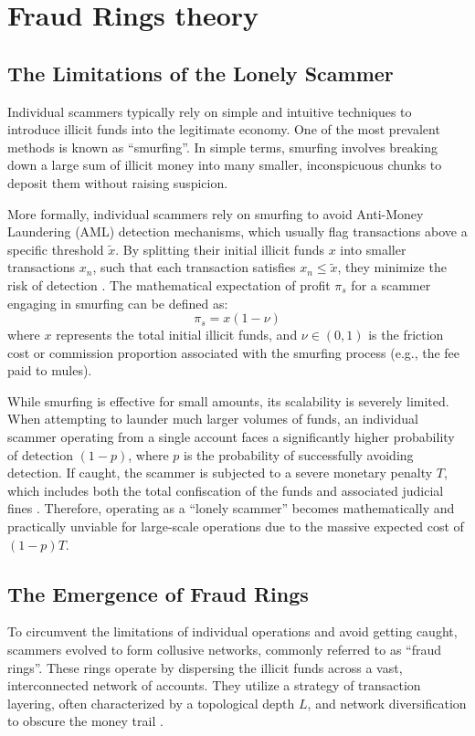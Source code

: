 \chapter{Fraud Rings theory}
\label{ch:fraud_ring_theory}

\section{The Limitations of the Lonely Scammer}
Individual scammers typically rely on simple and intuitive techniques to introduce illicit funds into the legitimate economy. One of the most prevalent methods is known as ``smurfing''. In simple terms, smurfing involves breaking down a large sum of illicit money into many smaller, inconspicuous chunks to deposit them without raising suspicion. 

More formally, individual scammers rely on smurfing to avoid Anti-Money Laundering (AML) detection mechanisms, which usually flag transactions above a specific threshold $\tilde{x}$. By splitting their initial illicit funds $x$ into smaller transactions $x_n$, such that each transaction satisfies $x_n \leq \tilde{x}$, they minimize the risk of detection \cite{contreras2026strategic}. The mathematical expectation of profit $\pi_s$ for a scammer engaging in smurfing can be defined as:
\begin{equation}
    \pi_s = x(1-\nu)
\end{equation}
where $x$ represents the total initial illicit funds, and $\nu \in (0,1)$ is the friction cost or commission proportion associated with the smurfing process (e.g., the fee paid to mules). 

While smurfing is effective for small amounts, its scalability is severely limited. When attempting to launder much larger volumes of funds, an individual scammer operating from a single account faces a significantly higher probability of detection $(1-p)$, where $p$ is the probability of successfully avoiding detection. If caught, the scammer is subjected to a severe monetary penalty $T$, which includes both the total confiscation of the funds and associated judicial fines \cite{contreras2026strategic}. Therefore, operating as a ``lonely scammer'' becomes mathematically and practically unviable for large-scale operations due to the massive expected cost of $(1-p)T$.

\section{The Emergence of Fraud Rings}
To circumvent the limitations of individual operations and avoid getting caught, scammers evolved to form collusive networks, commonly referred to as ``fraud rings''. These rings operate by dispersing the illicit funds across a vast, interconnected network of accounts. They utilize a strategy of transaction layering, often characterized by a topological depth $L$, and network diversification to obscure the money trail \cite{contreras2026strategic, li2025scamsweeper}.

